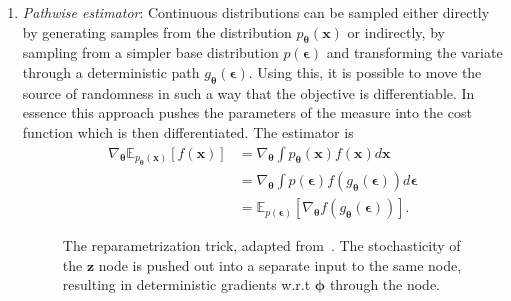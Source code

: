 \documentclass[final,3p,times,twocolumn]{elsarticle}
\begin{document}
\begin{enumerate}
	\item \emph{Pathwise estimator}: Continuous distributions can be sampled either directly by generating samples from the distribution $p_{\boldsymbol{\theta}}(\mathbf{x})$ or indirectly, by sampling from a simpler base distribution $p(\boldsymbol{\epsilon})$ and transforming the variate through a deterministic path $g_{\boldsymbol{\theta}}(\boldsymbol{\epsilon})$. Using this, it is possible to move the source of randomness in such a way that the objective is differentiable. In essence this approach pushes the parameters of the measure into the cost function which is then differentiated. The estimator is
	\begin{equation}
		\begin{aligned}
			\nabla_{\boldsymbol{\theta}} \mathbb{E}_{p_{\boldsymbol{\theta}}(\mathbf{x})}[f(\mathbf{x})] 
			 &=\nabla_{\boldsymbol{\theta}} \int p_{\boldsymbol{\theta}}(\mathbf{x}) f(\mathbf{x}) d \mathbf{x} \\
			 &= \nabla_{\boldsymbol{\theta}} \int p(\boldsymbol{\epsilon}) f(g_{\boldsymbol{\theta}}(\boldsymbol{\epsilon})) d \boldsymbol{\epsilon} \\
			 &= \mathbb{E}_{p(\boldsymbol{\epsilon})}\left[\nabla_{\boldsymbol{\theta}} f(g_{\boldsymbol{\theta}}(\boldsymbol{\epsilon}))\right].
		\end{aligned}
	\end{equation}
	\begin{figure}
		\caption{The reparametrization trick, adapted from~\cite{kingma2017variational}. The stochasticity of the $\mathbf{z}$ node is pushed out into a separate input to the same node, resulting in deterministic gradients w.r.t $\boldsymbol{\phi}$ through the node.}

\end{figure}
\end{enumerate}
\end{document}
